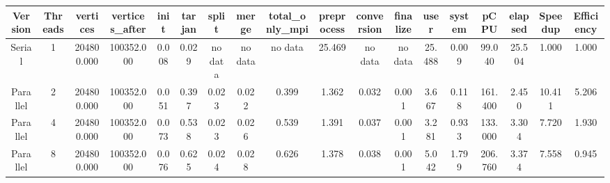 \begin{tabular}{|c|c|c|c|c|c|c|c|c|c|c|c|c|c|c|c|c|c|}
\toprule
 Version &  Threads &   vertices &  vertices\_after &  init &  tarjan &   split &   merge & total\_only\_mpi &  preprocess & conversion & finalize &   user &  system &    pCPU &  elapsed &  Speedup &  Efficiency \\
\midrule
  Serial &        1 & 204800.000 &      100352.000 & 0.008 &   0.029 & no data & no data &        no data &      25.469 &    no data &  no data & 25.488 &   0.009 &  99.040 &   25.504 &    1.000 &       1.000 \\
Parallel &        2 & 204800.000 &      100352.000 & 0.051 &   0.397 &   0.023 &   0.022 &          0.399 &       1.362 &      0.032 &    0.001 &  3.667 &   0.118 & 161.400 &    2.450 &   10.411 &       5.206 \\
Parallel &        4 & 204800.000 &      100352.000 & 0.073 &   0.538 &   0.023 &   0.026 &          0.539 &       1.391 &      0.037 &    0.001 &  3.281 &   0.933 & 133.000 &    3.304 &    7.720 &       1.930 \\
Parallel &        8 & 204800.000 &      100352.000 & 0.076 &   0.625 &   0.024 &   0.028 &          0.626 &       1.378 &      0.038 &    0.001 &  5.042 &   1.799 & 206.760 &    3.374 &    7.558 &       0.945 \\
\bottomrule
\end{tabular}
